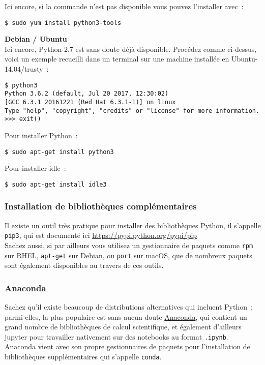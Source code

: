     Ici encore, si la commande n'est pas disponible vous pouvez l'installer
avec~:

    \begin{verbatim}
$ sudo yum install python3-tools
\end{verbatim}


\textbf{Debian / Ubuntu}\\

    Ici encore, Python-2.7 est sans doute déjà disponible. Procédez comme
ci-dessus, voici un exemple recueilli dans un terminal sur une machine
installée en Ubuntu-14.04/trusty~:

    \begin{verbatim}
$ python3
Python 3.6.2 (default, Jul 20 2017, 12:30:02)
[GCC 6.3.1 20161221 (Red Hat 6.3.1-1)] on linux
Type "help", "copyright", "credits" or "license" for more information.
>>> exit()
\end{verbatim}

    Pour installer Python~:

    \begin{verbatim}
$ sudo apt-get install python3
\end{verbatim}

    Pour installer idle~:

    \begin{verbatim}
$ sudo apt-get install idle3
\end{verbatim}

    \hypertarget{installation-de-bibliothuxe8ques-compluxe9mentaires}{%
\subsubsection{Installation de bibliothèques
complémentaires}\label{installation-de-bibliothuxe8ques-compluxe9mentaires}}

    Il existe un outil très pratique pour installer des bibliothèques
Python, il s'appelle \texttt{pip3}, qui est documenté ici
\href{https://pypi.python.org/pypi/pip}{https://pypi.python.org/pypi/pip}\\

    Sachez aussi, si par ailleurs vous utilisez un gestionnaire de paquets
comme \texttt{rpm} sur RHEL, \texttt{apt-get} sur Debian, ou
\texttt{port} sur macOS, que de nombreux paquets sont également
disponibles au travers de ces outils.

    \hypertarget{anaconda}{%
\subsubsection{Anaconda}\label{anaconda}}

    Sachez qu'il existe beaucoup de distributions alternatives qui incluent
Python~; parmi elles, la plus populaire est sans aucun doute
\href{https://www.anaconda.com/}{Anaconda}, qui contient un grand nombre
de bibliothèques de calcul scientifique, et également d'ailleurs jupyter
pour travailler nativement sur des notebooks au format \texttt{.ipynb}.\\

Anaconda vient avec son propre gestionnaires de paquets pour
l'installation de bibliothèques supplémentaires qui s'appelle
\texttt{conda}.